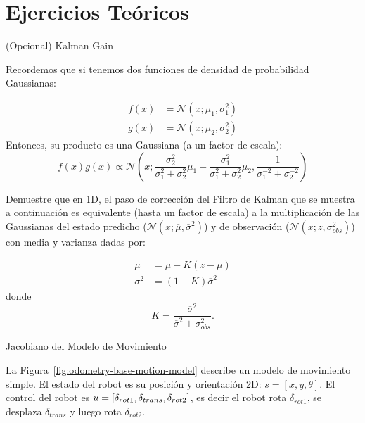 \documentclass[tp]{lcc}
\begin{document}
	
	\section{Ejercicios Teóricos}
    
    \ejercicio (Opcional) Kalman Gain
    
    Recordemos que si tenemos dos funciones de densidad de probabilidad Gaussianas:
    
    \begin{align*}
        f(x) &= \mathcal{N}(x;\mu_{1},\sigma_{1}^{2})\\
        g(x) &= \mathcal{N}(x;\mu_{2},\sigma_{2}^{2})
    \end{align*}
%
    Entonces, su producto es una Gaussiana (a un factor de escala):
%
    \begin{equation*}
        f(x)g(x) \propto \mathcal{N} \left(x; \dfrac{\sigma_{2}^{2}}{\sigma_{1}^{2} + \sigma_{2}^{2}}\mu_{1} + \dfrac{\sigma_{1}^{2}}{\sigma_{1}^{2} + \sigma_{2}^{2}}\mu_{2}, \dfrac{1}{\sigma_{1}^{-2} + \sigma_{2}^{-2}} \right)
    \end{equation*}

    Demuestre que en 1D, el paso de corrección del Filtro de Kalman que se muestra a continuación es equivalente (hasta un factor de escala) a la multiplicación de las Gaussianas del estado predicho ($\mathcal{N}(x;\overline{\mu},\overline{\sigma}^{2})$) y de observación ($\mathcal{N}(x;z, \sigma_{obs}^{2})$) con media y varianza dadas por:
    
    \begin{align*}
        \mu &= \overline{\mu} + K (z - \overline{\mu})\\
        \sigma^{2} &= (1 - K) \overline{\sigma}^{2}
    \end{align*}
%
    donde 
    \begin{equation*}
        K = \dfrac{\overline{\sigma}^{2}}{\overline{\sigma}^{2}+\sigma_{obs}^{2}}.
    \end{equation*}
	
	\ejercicio Jacobiano del Modelo de Movimiento
    \label{exercise:jacobian}
    
    La Figura~\ref{fig:odometry-base-motion-model} describe un modelo de movimiento simple. El estado del robot es su posición y orientación 2D: $s = [x, y, \theta]$. El control del robot es $u = [\delta_{rot1}, \delta_{trans}, \delta_{rot2}]$, es decir el robot rota $\delta_{rot1}$, se desplaza $\delta_{trans}$ y luego rota $\delta_{rot2}$.
    
\end{document}
